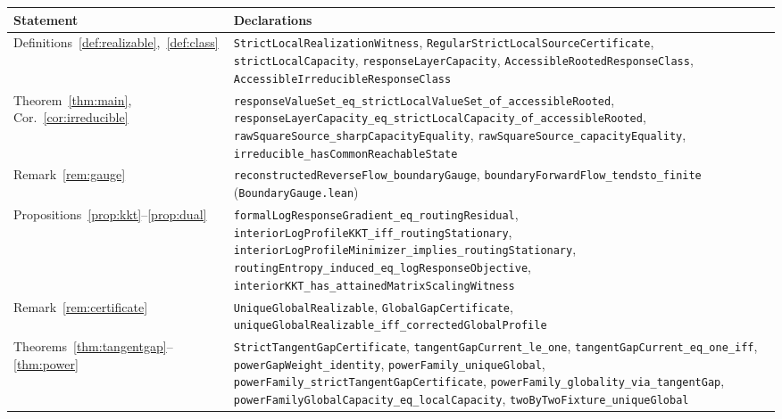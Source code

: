 \documentclass[11pt,reqno]{amsart}
\theoremstyle{plain}
\theoremstyle{definition}
\theoremstyle{remark}
\numberwithin{equation}{section}
\begin{document}
\begin{table}[H]
\centering\small
\begin{tabular}{@{}>{\raggedright\arraybackslash}p{}>{\raggedright\arraybackslash}p{}@{}}
\toprule
Statement & Declarations \\
\midrule
Definitions~\ref{def:realizable},~\ref{def:class} & \texttt{StrictLocalRealizationWitness}, \texttt{RegularStrictLocalSourceCertificate}, \texttt{strictLocalCapacity}, \texttt{responseLayerCapacity}, \texttt{AccessibleRootedResponseClass}, \texttt{AccessibleIrreducibleResponseClass} \\
Theorem~\ref{thm:main}, Cor.~\ref{cor:irreducible} & \texttt{responseValueSet\_\allowbreak eq\_\allowbreak strictLocalValueSet\_\allowbreak of\_\allowbreak accessibleRooted}, \texttt{responseLayerCapacity\_\allowbreak eq\_\allowbreak strictLocalCapacity\_\allowbreak of\_\allowbreak accessibleRooted}, \texttt{rawSquareSource\_\allowbreak sharpCapacityEquality}, \texttt{rawSquareSource\_\allowbreak capacityEquality}, \texttt{irreducible\_\allowbreak hasCommonReachableState} \\
Remark~\ref{rem:gauge} & \texttt{reconstructedReverseFlow\_\allowbreak boundaryGauge}, \texttt{boundaryForwardFlow\_\allowbreak tendsto\_\allowbreak finite} (\texttt{BoundaryGauge.lean}) \\
Propositions~\ref{prop:kkt}--\ref{prop:dual} & \texttt{formalLogResponseGradient\_\allowbreak eq\_\allowbreak routingResidual}, \texttt{interiorLogProfileKKT\_\allowbreak iff\_\allowbreak routingStationary}, \texttt{interiorLogProfileMinimizer\_\allowbreak implies\_\allowbreak routingStationary}, \texttt{routingEntropy\_\allowbreak induced\_\allowbreak eq\_\allowbreak logResponseObjective}, \texttt{interiorKKT\_\allowbreak has\_\allowbreak attainedMatrixScalingWitness} \\
Remark~\ref{rem:certificate} & \texttt{UniqueGlobalRealizable}, \texttt{GlobalGapCertificate}, \texttt{uniqueGlobalRealizable\_\allowbreak iff\_\allowbreak correctedGlobalProfile} \\
Theorems~\ref{thm:tangentgap}--\ref{thm:power} & \texttt{StrictTangentGapCertificate}, \texttt{tangentGapCurrent\_\allowbreak le\_\allowbreak one}, \texttt{tangentGapCurrent\_\allowbreak eq\_\allowbreak one\_\allowbreak iff}, \texttt{powerGapWeight\_\allowbreak identity}, \texttt{powerFamily\_\allowbreak uniqueGlobal}, \texttt{powerFamily\_\allowbreak strictTangentGapCertificate}, \texttt{powerFamily\_\allowbreak globality\_\allowbreak via\_\allowbreak tangentGap}, \texttt{powerFamilyGlobalCapacity\_\allowbreak eq\_\allowbreak localCapacity}, \texttt{twoByTwoFixture\_\allowbreak uniqueGlobal} \\

\end{tabular}
\end{table}
\end{document}
